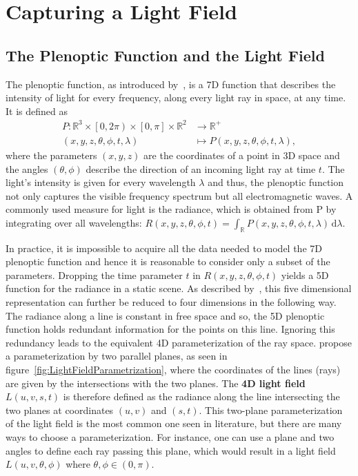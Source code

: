 \chapter{Capturing a Light Field}

\section{The Plenoptic Function and the Light Field}

The plenoptic function, as introduced by~\cite{AdelsonBergen}, is a 7D function that describes the intensity of light for every frequency, along every light ray in space, at any time. 
It is defined as
\begin{align*}
	P \colon \mathbb{R}^3 \times \left[0, 2 \pi \right) \times \left[ 0, \pi \right] \times \mathbb{R}^2 & \to \mathbb{R}^+ \\
	\left(x, y, z, \theta, \phi, t, \lambda \right) & \mapsto P\left(x, y, z, \theta, \phi, t, \lambda \right), 
\end{align*}
where the parameters $\left(x, y, z\right)$ are the coordinates of a point in 3D space and the angles $\left(\theta, \phi \right)$ describe the direction of an incoming light ray at time $t$. 
The light's intensity is given for every wavelength $\lambda$ and thus, the plenoptic function not only captures the visible frequency spectrum but all electromagnetic waves. 
A commonly used measure for light is the radiance, which is obtained from P by integrating over all wavelengths: 
$R\left(x, y, z, \theta, \phi, t\right) = \int_{\mathbb{R}} \! P\left(x, y, z, \theta, \phi, t, \lambda \right) \, \mathrm{d} \lambda$.

In practice, it is impossible to acquire all the data needed to model the 7D plenoptic function and hence it is reasonable to consider only a subset of the parameters. 
Dropping the time parameter $t$ in $R\left( x, y, z, \theta, \phi, t \right) $ yields a 5D function for the radiance in a static scene. 
As described by~\cite{LightFieldRendering}, this five dimensional representation can further be reduced to four dimensions in the following way. 
The radiance along a line is constant in free space and so, the 5D plenoptic function holds redundant information for the points on this line. 
Ignoring this redundancy leads to the equivalent 4D parameterization of the ray space. 
\cite{LightFieldRendering} propose a parameterization by two parallel planes, as seen in figure~\ref{fig:LightFieldParametrization}, where the coordinates of the lines (rays) are given by the intersections with the two planes.
The \textbf{4D light field} $L(u, v, s, t)$ is therefore defined as the radiance along the line intersecting the two planes at coordinates $(u, v)$ and $(s, t)$.
This two-plane parameterization of the light field is the most common one seen in literature, but there are many ways to choose a parameterization.
For instance, one can use a plane and two angles to define each ray passing this plane, which would result in a light field $L(u, v, \theta, \phi)$ where $\theta, \phi \in (0, \pi)$.

